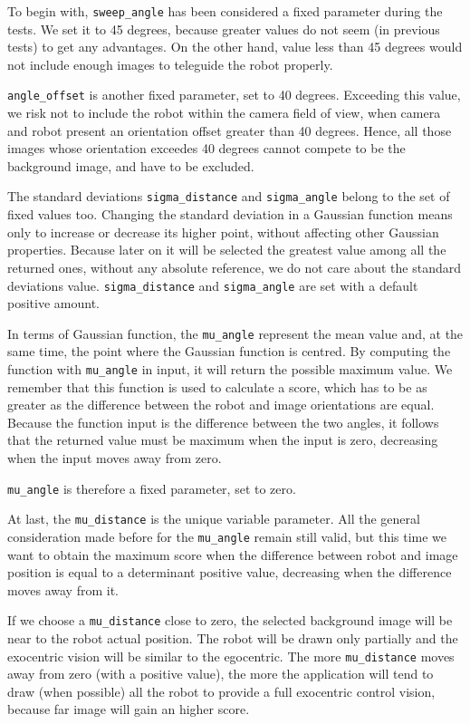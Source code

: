 %

%

%
To begin with, \texttt{sweep\_angle} has been considered a fixed parameter during the tests. We set it to 45 degrees,
because greater values do not seem (in previous tests) to get any advantages. On the other hand, value less than 45
degrees would not include enough images to teleguide the robot properly.
%

%
\texttt{angle\_offset} is another fixed parameter, set to 40 degrees. Exceeding this value, we risk not to include
the robot within the camera field of view, when camera and robot present an orientation offset greater than 40 degrees.
Hence, all those images whose orientation exceedes 40 degrees cannot compete to be the background image, 
and have to be excluded.
%

%
The standard deviations \texttt{sigma\_distance} and \texttt{sigma\_angle} belong to the set of
fixed values too. Changing the standard deviation in a Gaussian function means only to increase or decrease its higher
point, without affecting other Gaussian properties. Because later on it will be selected the greatest value among
all the returned ones, without any absolute reference, we do not care about the standard deviations value.
\texttt{sigma\_distance} and \texttt{sigma\_angle} are set with a default positive amount.
%

%
In terms of Gaussian function, the \texttt{mu\_angle} represent the mean value and, at the same time, the point where
the Gaussian function is centred. By computing the function with \texttt{mu\_angle} in input, it will return the possible
maximum value. We remember that this function is used to calculate a score, which has to be as greater as the difference
between the robot and image orientations are equal. Because the function input is the difference between the two angles, it
follows that the returned value must be maximum when the input is zero, decreasing when the input moves away from zero.
%

%
\texttt{mu\_angle} is therefore a fixed parameter, set to zero.
%

%
At last, the \texttt{mu\_distance} is the unique variable parameter. All the general consideration made before for the 
\texttt{mu\_angle} remain still valid, but this time we want to obtain the maximum score when the difference between
robot and image position is equal to a determinant positive value, decreasing when the difference moves away from it.
%

%
If we choose a \texttt{mu\_distance} close to zero, the selected background image will be near to the robot actual position.
The robot will be drawn only partially and the exocentric vision will be similar to the egocentric. The more
\texttt{mu\_distance} moves away from zero (with a positive value), the more the application will tend to draw
(when possible) all the robot to provide a full exocentric control vision, because far image will gain an higher score.
%

